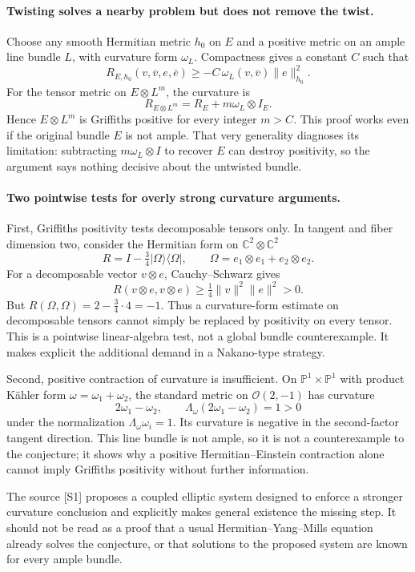 \documentclass[11pt]{article}
\begin{document}
\paragraph{Twisting solves a nearby problem but does not remove the twist.}
Choose any smooth Hermitian metric $h_0$ on $E$ and a positive metric on an ample line bundle $L$, with curvature form $\omega_L$. Compactness gives a constant $C$ such that
\[
 R_{E,h_0}(v,\overline v,e,\overline e)
 \ge-C\,\omega_L(v,\overline v)\|e\|_{h_0}^2.
\]
For the tensor metric on $E\otimes L^m$, the curvature is
\[
 R_{E\otimes L^m}=R_E+m\omega_L\otimes I_E.
\]
Hence $E\otimes L^m$ is Griffiths positive for every integer $m>C$. This proof works even if the original bundle $E$ is not ample. That very generality diagnoses its limitation: subtracting $m\omega_L\otimes I$ to recover $E$ can destroy positivity, so the argument says nothing decisive about the untwisted bundle.

\paragraph{Two pointwise tests for overly strong curvature arguments.}
First, Griffiths positivity tests decomposable tensors only. In tangent and fiber dimension two, consider the Hermitian form on $\mathbb C^2\otimes\mathbb C^2$
\[
 R=I-\tfrac34|\Omega\rangle\langle\Omega|,
 \qquad \Omega=e_1\otimes e_1+e_2\otimes e_2.
\]
For a decomposable vector $v\otimes e$, Cauchy--Schwarz gives
\[
 R(v\otimes e,v\otimes e)
 \ge\tfrac14\|v\|^2\|e\|^2>0.
\]
But $R(\Omega,\Omega)=2-\tfrac34\cdot4=-1$. Thus a curvature-form estimate on decomposable tensors cannot simply be replaced by positivity on every tensor. This is a pointwise linear-algebra test, not a global bundle counterexample. It makes explicit the additional demand in a Nakano-type strategy.

Second, positive contraction of curvature is insufficient. On $\mathbb P^1\times\mathbb P^1$ with product Kähler form $\omega=\omega_1+\omega_2$, the standard metric on $\mathcal O(2,-1)$ has curvature
\[
 2\omega_1-\omega_2,
 \qquad \Lambda_\omega(2\omega_1-\omega_2)=1>0
\]
under the normalization $\Lambda_\omega\omega_i=1$. Its curvature is negative in the second-factor tangent direction. This line bundle is not ample, so it is not a counterexample to the conjecture; it shows why a positive Hermitian--Einstein contraction alone cannot imply Griffiths positivity without further information.

The source [S1] proposes a coupled elliptic system designed to enforce a stronger curvature conclusion and explicitly makes general existence the missing step. It should not be read as a proof that a usual Hermitian--Yang--Mills equation already solves the conjecture, or that solutions to the proposed system are known for every ample bundle.
\end{document}
